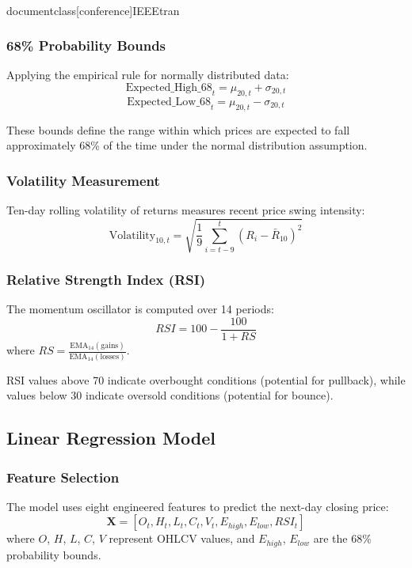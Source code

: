 \\documentclass[conference]{IEEEtran}
\begin{document}
\subsubsection{68\% Probability Bounds}
Applying the empirical rule for normally distributed data:
\begin{equation}
    \text{Expected\_High\_68}_t = \mu_{20,t} + \sigma_{20,t}
\end{equation}
\begin{equation}
    \text{Expected\_Low\_68}_t = \mu_{20,t} - \sigma_{20,t}
\end{equation}

These bounds define the range within which prices are expected to fall approximately 68\% of the time under the normal distribution assumption.

\subsubsection{Volatility Measurement}
Ten-day rolling volatility of returns measures recent price swing intensity:
\begin{equation}
    \text{Volatility}_{10,t} = \sqrt{\frac{1}{9}\sum_{i=t-9}^{t}(R_i - \bar{R}_{10})^2}
\end{equation}

\subsubsection{Relative Strength Index (RSI)}
The momentum oscillator is computed over 14 periods:
\begin{equation}
    RSI = 100 - \frac{100}{1 + RS}
\end{equation}
where $RS = \frac{\text{EMA}_{14}(\text{gains})}{\text{EMA}_{14}(\text{losses})}$.

RSI values above 70 indicate overbought conditions (potential for pullback), while values below 30 indicate oversold conditions (potential for bounce).

\subsection{Linear Regression Model}

\subsubsection{Feature Selection}
The model uses eight engineered features to predict the next-day closing price:
\begin{equation}
    \mathbf{X} = [O_t, H_t, L_t, C_t, V_t, E_{high}, E_{low}, RSI_t]
\end{equation}
where $O$, $H$, $L$, $C$, $V$ represent OHLCV values, and $E_{high}$, $E_{low}$ are the 68\% probability bounds.
\end{document}
